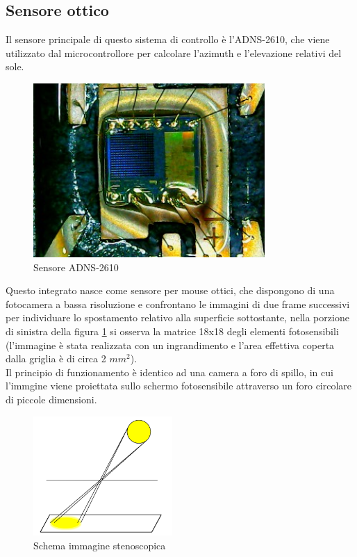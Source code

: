 \documentclass[12pt]{article}
\begin{document}
    
    \subsection{Sensore ottico}\label{optical_sensor}
    Il sensore principale di questo sistema di controllo è l'ADNS-2610, che viene utilizzato dal microcontrollore per calcolare l'azimuth e l'elevazione relativi del sole.\\
    
    \begin{figure}[h]
        \centering
        \includegraphics[width=250pt]{Draws/ADNS-2610_die/WIN_20210501_17_42_53_Pro.jpg}
        \caption{Sensore ADNS-2610}
        \label{fig:ADNS2610_die}
    \end{figure}
   
    \noindent
    Questo integrato nasce come sensore per mouse ottici, che dispongono di una fotocamera a bassa risoluzione e confrontano le immagini di due frame successivi per individuare lo spostamento relativo alla superficie sottostante, nella porzione di sinistra della figura \ref{fig:ADNS2610_die} si osserva la matrice 18x18 degli elementi fotosensibili (l'immagine è stata realizzata con un ingrandimento e l'area effettiva coperta dalla griglia è di circa 2 $mm^2$).\\
    Il principio di funzionamento è identico ad una camera a foro di spillo, in cui l'immgine viene proiettata sullo schermo fotosensibile attraverso un foro circolare di piccole dimensioni.
    
    \begin{figure}[h]
        \centering
        \includegraphics[width=150pt]{Draws/Pinhole_sun}
        \caption{Schema immagine stenoscopica}
        \label{fig:pinhole_sun}
    \end{figure}
    
\end{document}
